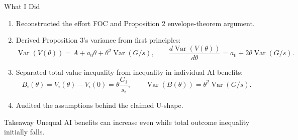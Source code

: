\documentclass[aspectratio=169,11pt]{beamer}
\begin{document}
\begin{frame}{What I Did}
  \begin{enumerate}
    \item Reconstructed the effort FOC and Proposition 2 envelope-theorem argument.

    \item Derived Proposition 3's variance from first principles:
      \[
        \operatorname{Var}(V(\theta))
        =A+a_0\theta+\theta^2\operatorname{Var}(G/s),
        \qquad
        \frac{d\operatorname{Var}(V(\theta))}{d\theta}
        =a_0+2\theta\operatorname{Var}(G/s).
      \]

    \item Separated total-value inequality from inequality in individual AI benefits:
      \[
        B_i(\theta)=V_i(\theta)-V_i(0)=\theta\frac{G_i}{s_i},
        \qquad
        \operatorname{Var}(B(\theta))=\theta^2\operatorname{Var}(G/s).
      \]

    \item Audited the assumptions behind the claimed U-shape.
  \end{enumerate}

  \begin{alertblock}{Takeaway}
    Unequal AI benefits can increase even while total outcome inequality initially falls.
  \end{alertblock}
\end{frame}
\end{document}
